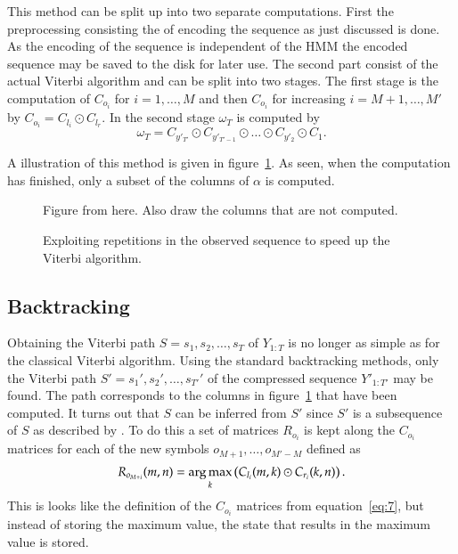 This method can be split up into two separate computations. First the
preprocessing consisting the of encoding the sequence as just discussed is
done. As the encoding of the sequence is independent of the HMM the encoded
sequence may be saved to the disk for later use. The second part consist of the
actual Viterbi algorithm and can be split into two stages. The first stage is
the computation of $C_{o_i}$ for $i = 1, \dots, M$ and then $C_{o_i}$ for
increasing $i = M + 1, \dots, M'$ by $C_{o_i} = C_{l_i} \odot C_{l_r}$. In the
second stage $\omega_T$ is computed by
\begin{equation}
  \label{eq:3}
  \omega_T = C_{y'_{T'}} \odot C_{y'_{T'-1}} \odot \dots \odot C_{y'_2} \odot C_1.
\end{equation}

A illustration of this method is given in
figure~\ref{fig:exploiting-repetitions}. As seen, when the computation has
finished, only a subset of the columns of $\alpha$ is computed.

\begin{figure}
  \centering
  Figure from \citet{sand2013ziphmmlib} here. Also draw the columns that are
  not computed.
  \caption{Exploiting repetitions in the observed sequence to speed up the
    Viterbi algorithm.}
  \label{fig:exploiting-repetitions}
\end{figure}

\subsection{Backtracking}
\label{sec:backtracking}

Obtaining the Viterbi path $S = s_1, s_2, \dots, s_T$ of $Y_{1:T}$ is no longer
as simple as for the classical Viterbi algorithm. Using the standard
backtracking methods, only the Viterbi path $S' = s_1', s_2', \dots, s_{T'}'$
of the compressed sequence $Y'_{1:T'}$ may be found. The path corresponds to
the columns in figure~\ref{fig:exploiting-repetitions} that have been
computed. It turns out that $S$ can be inferred from $S'$ since $S'$
is a subsequence of $S$ as described by \citet{lifshits2009speeding}. To do
this a set of matrices $R_{o_i}$ is kept along the $C_{o_i}$ matrices for each
of the new symbols $o_{M + 1}, \dots, o_{M' - M}$ defined as
\begin{equation*}
  R_{o_{M + i}}(m, n) = \operatorname*{arg\,max}_k
  \left(
    C_{l_i}(m, k) \odot C_{r_i}(k, n)
  \right).
\end{equation*}
This is looks like the definition of the $C_{o_i}$ matrices from
equation~\eqref{eq:7}, but instead of storing the maximum value, the state that
results in the maximum value is stored.

